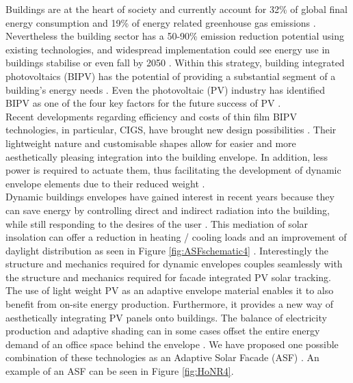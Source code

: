 
Buildings are at the heart of society and currently account for 32\% of global final energy consumption and 19\% of energy related greenhouse gas emissions \cite{IPCC}. Nevertheless the building sector has a 50-90\% emission reduction potential using existing technologies, and widespread implementation could see energy use in buildings stabilise or even fall by 2050 \cite{IPCC}. Within this strategy, building integrated photovoltaics (BIPV) has the potential of providing a substantial segment of a building's energy needs \cite{defaix2012technical}. Even the photovoltaic (PV) industry has identified BIPV as one of the four key factors for the future success of PV \cite{raugei2009life}. \\

Recent developments regarding efficiency and costs of thin film BIPV technologies, in particular, CIGS, have brought new design possibilities \cite{NREL, kushiya2014cis, kaelin2004low, jelle2012building}. Their lightweight nature and customisable shapes allow for easier and more aesthetically pleasing integration into the building envelope. In addition, less power is required to actuate them, thus facilitating the development of dynamic envelope elements due to their reduced weight \cite{rossi2012adaptive}. \\





Dynamic buildings envelopes have gained interest in recent years because they can save energy by controlling direct and indirect radiation into the building, while still responding to the desires of the user \cite{loonen2013climate}. This mediation of solar insolation can offer a reduction in heating / cooling loads and an improvement of daylight distribution as seen in Figure \ref{fig:ASFschematic4} \cite{rossi2012adaptive}. Interestingly the structure and mechanics required for dynamic envelopes couples seamlessly with the structure and mechanics required for facade integrated PV solar tracking. The use of light weight PV as an adaptive envelope material enables it to also benefit from on-site energy production. Furthermore, it provides a new way of aesthetically integrating PV panels onto buildings. The balance of electricity production and adaptive shading can in some cases offset the entire energy demand of an office space behind the envelope \cite{jayathissa2015abs}. We have proposed one possible combination of these technologies as an Adaptive Solar Facade (ASF) \cite{nagy2016adaptive}. An example of an ASF can be seen in Figure \ref{fig:HoNR4}.




